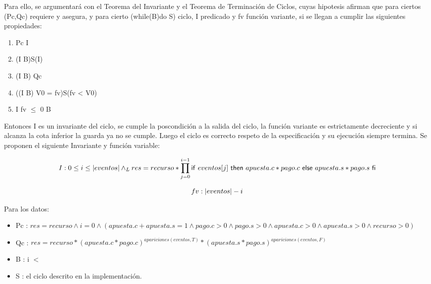 \documentclass[10pt,a4paper]{article}
\begin{document}
\vspace{0.3cm} 

 Para ello, se argumentará con el Teorema del Invariante y el Teorema de Terminación de Ciclos, cuyas hipotesis afirman que
 para ciertos (Pc,Qc) requiere y asegura, y para cierto (while(B)do S) ciclo, I predicado y fv función variante,
 si se llegan a cumplir las siguientes propiedades:

\begin{enumerate} \setlength\itemsep{1cm}
	\item Pc \implica I

	\item (I \land B)S(I)

	\item (I \land \neg B) \implica Qc %

	\item ((I \land B) \land V0 = fv)S(fv < V0)

	\item I \land fv $\leq$ 0 \implica \neg B
\end{enumerate}

\vspace{0.3cm}

 Entonces I es un invariante del ciclo, se cumple la poscondición a la salida del ciclo,
 la función variante es estrictamente decreciente y si alcanza la cota inferior la guarda ya no se cumple.
 Luego el ciclo es correcto respeto de la especificación y su ejecución siempre termina.
 Se proponen el siguiente Invariante y función variable:

\begin{equation}
	I: 0 \leq i \leq |eventos| \land _L res = recurso * \prod\limits_{j=0}^{i-1} \mathsf{if}\ eventos[j]\ \mathsf{then}\ apuesta.c * pago.c\ \mathsf{else}\ apuesta.s * pago.s\ \mathsf{fi}
\end{equation}

\begin{equation}
	fv: |eventos| - i
\end{equation}

 Para los datos:

\begin{itemize}
	\item Pc : $res = recurso \land i = 0 \land (apuesta.c + apuesta.s = 1 \land pago.c > 0 \land pago.s > 0 \land apuesta.c > 0 \land apuesta.s > 0 \land recurso > 0)$
	\item Qc : $res = recurso * (apuesta.c * pago.c)^{apariciones(eventos, T)} * (apuesta.s * pago.s)^{apariciones(eventos, F)}$
	\item B : i $<$ 
	\item S : el ciclo descrito en la implementación.
\end{itemize}
\end{document}

